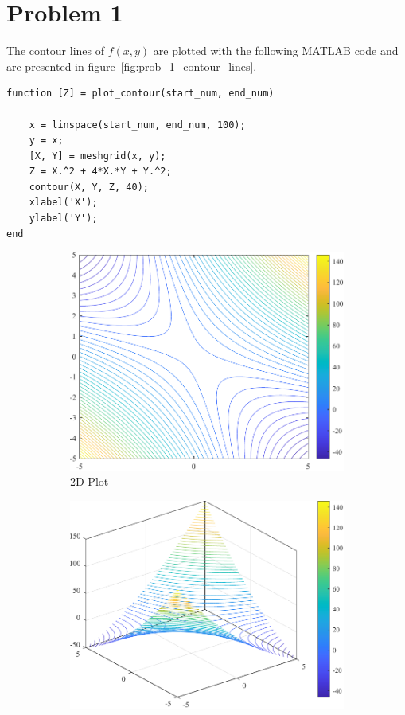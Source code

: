 \section{Problem 1}

The contour lines of $f(x,y)$ are plotted with the following MATLAB code and are presented in figure~\ref{fig:prob_1_contour_lines}.

\begin{lstlisting}[]
function [Z] = plot_contour(start_num, end_num)
	
	x = linspace(start_num, end_num, 100);
	y = x;
	[X, Y] = meshgrid(x, y);
	Z = X.^2 + 4*X.*Y + Y.^2;
	contour(X, Y, Z, 40);
	xlabel('X');
	ylabel('Y');
end
\end{lstlisting}
\begin{figure}[h]
	\centering
	\begin{subfigure}{0.4\textwidth}
		\includegraphics[width=\textwidth]{../Problem 1/contour_lines_2d.pdf}
		\caption{2D Plot}
		\label{fig:prob_1_contour_lines_2d}
	\end{subfigure}
	\begin{subfigure}{0.4\textwidth}
		\includegraphics[width=\textwidth]{../Problem 1/contour_lines_3d.pdf}

\end{subfigure}
\end{figure}
